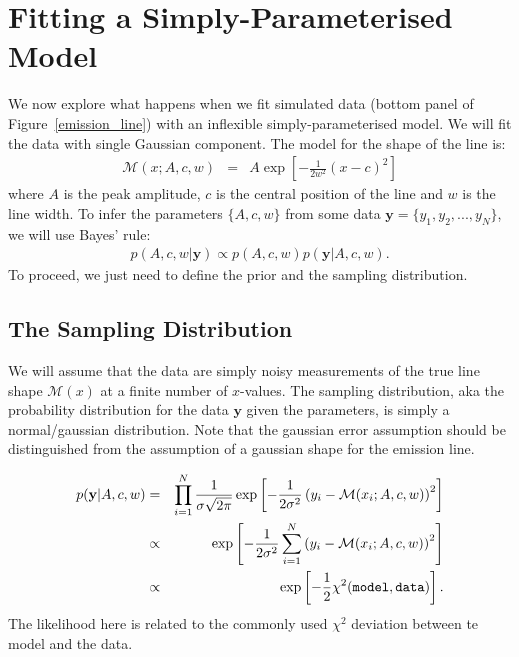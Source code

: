 \documentclass[letterpaper, 11pt]{article}
\newcommand{\yy}{\mathbf{y}}
\begin{document}
\section{Fitting a Simply-Parameterised Model}
We now explore what happens when we fit simulated data (bottom panel of
Figure~\ref{emission_line}) with an inflexible simply-parameterised model.
We will fit the data with single Gaussian component.
The model for the shape of the line is:
\begin{eqnarray}
\mathcal{M}(x; A, c, w) &=&
A\exp
\left[
-\frac{1}{2w^2}
\left(x - c\right)^2
\right]
\end{eqnarray}
where $A$ is the peak amplitude, $c$ is the central position of the line
and $w$ is the line width. To infer the parameters $\{A, c, w\}$ from some data
$\yy = \{y_1, y_2, ..., y_N\}$, we will use Bayes' rule:
\begin{eqnarray}
p(A, c, w | \yy) \propto p(A, c, w)p(\yy | A, c, w).
\end{eqnarray}
To proceed, we just need to define the prior and the sampling distribution.

\subsection{The Sampling Distribution}
We will assume that the data are simply noisy measurements of the true line shape
$\mathcal{M}(x)$ at a finite number of $x$-values.
The sampling distribution, aka the probability distribution for the data $\yy$ given
the parameters, is simply a normal/gaussian distribution. Note that the
gaussian error assumption should be distinguished from the assumption of a gaussian
shape for the emission line.

\begin{eqnarray}
p(\yy|A, c, w) &=& \prod_{i=1}^N
\frac{1}{\sigma\sqrt{2\pi}}
\exp
\left[
-\frac{1}{2\sigma^2}\left(y_i - \mathcal{M}(x_i; A, c, w)\right)^2
\right] \\
&\propto& \exp\left[-\frac{1}{2\sigma^2}\sum_{i=1}^N\left(y_i - \mathcal{M}(x_i; A, c, w)\right)^2\right] \\
&\propto& \exp\left[-\frac{1}{2}\chi^2({\tt model}, {\tt data})\right].
\end{eqnarray}
The likelihood here is related to the commonly used $\chi^2$ deviation between
te model and the data.
\end{document}
